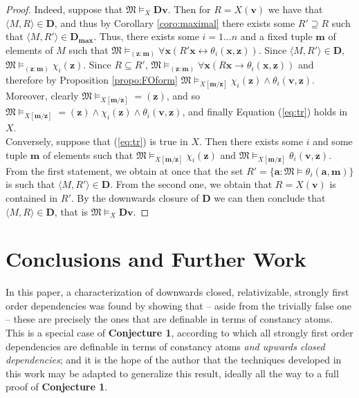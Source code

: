 \documentclass{article}
\theoremstyle{definition}
\newcommand{\tuple}{\mathbf}
\newcommand{\M}{\mathfrak M}
\newcommand{\D}{\mathbf D}
\newcommand{\Dmax}{\mathbf D_{\textbf{max}}}
\begin{document}
\begin{proof}
			Indeed, suppose that $\M \models_X \D \tuple v$. Then for $R = X(\tuple v)$ we have that $\langle M, R\rangle \in \D$, and thus by Corollary \ref{coro:maximal} there exists some $R' \supseteq R$ such that $\langle M, R'\rangle \in \Dmax$. Thus, there exists some $i = 1\ldots n$ and a fixed tuple $\tuple m$ of elements of $M$ such that $\M \models_{(\tuple z : \tuple m)} \forall \tuple x(R' \tuple x \leftrightarrow \theta_i(\tuple x, \tuple z))$. Since $\langle M, R'\rangle \in \D$, $\M \models_{(\tuple z: \tuple m)} \chi_i(\tuple z)$. Since $R \subseteq R'$, $\M \models_{(\tuple z : \tuple m)} \forall \tuple x(R \tuple x \rightarrow \theta_i(\tuple x, \tuple z))$ and therefore by Proposition \ref{propo:FOform} $\M \models_{X[\tuple m/\tuple z]} \chi_i(\tuple z) \wedge \theta_i(\tuple v, \tuple z)$.  Moreover, clearly $\M \models_{X[\tuple m/\tuple z]} =\!\!(\tuple z)$, and so $\M \models_{X[\tuple m/\tuple z]} =\!\!(\tuple z) \wedge \chi_i(\tuple z) \wedge \theta_i(\tuple v, \tuple z)$, and finally Equation (\ref{eq:tr}) holds in $X$.\\


			Conversely, suppose that (\ref{eq:tr}) is true in $X$. Then there exists some $i$ and some tuple $\tuple m$ of elements such that $\M \models_{X[\tuple m/\tuple z]} \chi_i(\tuple z)$ and $\M \models_{X[\tuple m/\tuple z]} \theta_i(\tuple v, \tuple z)$. From the first statement, we obtain at once that the set $R' = \{\tuple a: \M \models \theta_i(\tuple a, \tuple m)\}$ is such that $\langle M, R'\rangle \in \D$. From the second one, we obtain that $R = X(\tuple v)$ is contained in $R'$. By the downwards closure of $\D$ we can then conclude that $\langle M, R\rangle \in \D$, that is $\M \models_X \D \tuple v$.
\end{proof}
\section{Conclusions and Further Work}
In this paper, a characterization of downwards closed, relativizable, strongly first order dependencies was found by showing that -- aside from the trivially false one -- these are precisely the ones that are definable in terms of constancy atoms. This is a special case of \textbf{Conjecture 1}, according to which all strongly first order dependencies are definable in terms of constancy atoms \emph{and upwards closed dependencies}; and it is the hope of the author that the techniques developed in this work may be adapted to generalize this result, ideally all the way to a full proof of \textbf{Conjecture 1}. 
\end{document}
